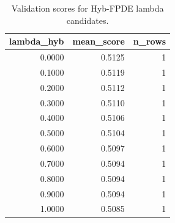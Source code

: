 \begin{table}[t]
\caption{Validation scores for Hyb-FPDE lambda candidates.}
\label{tab:lambda_distribution_computed}
\centering
\begin{tabular}{rrr}
\toprule
lambda\_hyb & mean\_score & n\_rows \\
\midrule
0.0000 & 0.5125 & 1 \\
0.1000 & 0.5119 & 1 \\
0.2000 & 0.5112 & 1 \\
0.3000 & 0.5110 & 1 \\
0.4000 & 0.5106 & 1 \\
0.5000 & 0.5104 & 1 \\
0.6000 & 0.5097 & 1 \\
0.7000 & 0.5094 & 1 \\
0.8000 & 0.5094 & 1 \\
0.9000 & 0.5094 & 1 \\
1.0000 & 0.5085 & 1 \\
\bottomrule
\end{tabular}

\end{table}

